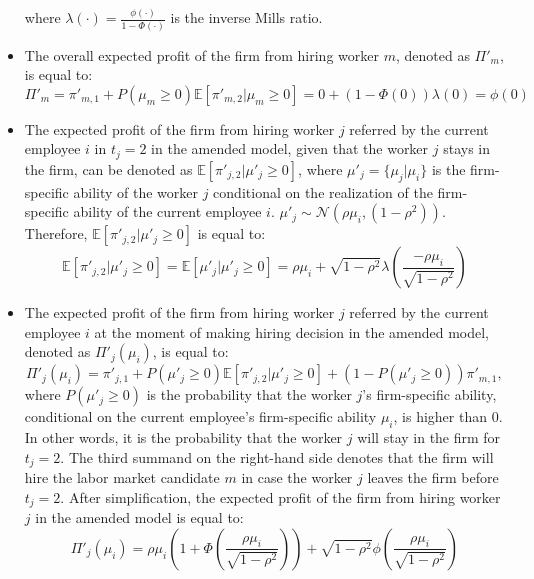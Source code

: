 \documentclass[12pt]{article}
\begin{document}
\begin{itemize}
\begin{equation*}
    \end{equation*}
    where $\lambda(\cdot) = \frac{\phi(\cdot)}{1-\Phi(\cdot)}$ is the inverse Mills ratio.
    \item The overall expected profit of the firm from hiring worker $m$, denoted as $
    \Pi'_m$, is equal to:
    \begin{equation}\label{eq_ext_profit_m}
        \Pi'_m = \pi'_{m,1}+P(\mu_m \geq 0)\mathbb{E}\left[\pi'_{m,2}|\mu_m \geq 0\right] 
        = 0 + \left( 1- \Phi \left( 0 \right) \right) \lambda(0)
        = \phi(0)
    \end{equation}
    \item The expected profit of the firm from hiring worker $j$ referred by the current employee $i$ in $t_j = 2$ in the amended model, given that the worker $j$ stays in the firm, can be denoted as $\mathbb{E}[\pi'_{j,2}| \mu'_j \geq 0]$, where $\mu'_j = \lbrace \mu_j | \mu_i \rbrace$ is the firm-specific ability of the worker $j$ conditional on the realization of the firm-specific ability of the current employee $i$. $\mu'_j \sim \mathcal{N}\left( \rho\mu_i, (1-\rho^2)\right)$. Therefore, $\mathbb{E}[\pi'_{j,2}| \mu'_j \geq 0]$ is equal to:
    \begin{equation*}
        \mathbb{E}[\pi'_{j,2}| \mu'_j \geq 0]
        = \mathbb{E}[\mu'_j| \mu'_j \geq 0]
        = \rho\mu_i + \sqrt{1-\rho^2}\lambda \left(\frac{-\rho\mu_i}{\sqrt{1-\rho^2}}\right)
    \end{equation*}
    \item The expected profit of the firm from hiring worker $j$ referred by the current employee $i$ at the moment of making hiring decision in the amended model, denoted as $\Pi'_j(\mu_i)$, is equal to:
    \begin{equation*}
        \Pi'_j(\mu_i) = \pi'_{j,1} + P\left( \mu'_j \geq 0 \right) \mathbb {E}[\pi'_{j,2} | \mu'_j \geq 0] 
        + (1 - P\left( \mu'_j \geq 0 \right)) \pi'_{m,1},
    \end{equation*}
    where $P\left( \mu'_j \geq 0 \right)$ is the probability that the worker $j$'s firm-specific ability, conditional on the current employee's firm-specific ability $\mu_i$, is higher than $0$. In other words, it is the probability that the worker $j$ will stay in the firm for $t_j = 2$. The third summand on the right-hand side denotes that the firm will hire the labor market candidate $m$ in case the worker $j$ leaves the firm before $t_j = 2$. After simplification, the expected profit of the firm from hiring worker $j$ in the amended model is equal to:
    \begin{equation}\label{eq_ext_pi_j_y_i}
        \Pi'_j(\mu_i) = \rho\mu_i \left(1+\Phi\left(\frac{\rho\mu_i}{\sqrt{1-\rho^2}}\right)\right) + \sqrt{1-\rho^2}\phi\left(\frac{\rho\mu_i}{\sqrt{1-\rho^2}}\right)
    \end{equation}


\end{itemize}
\end{document}
